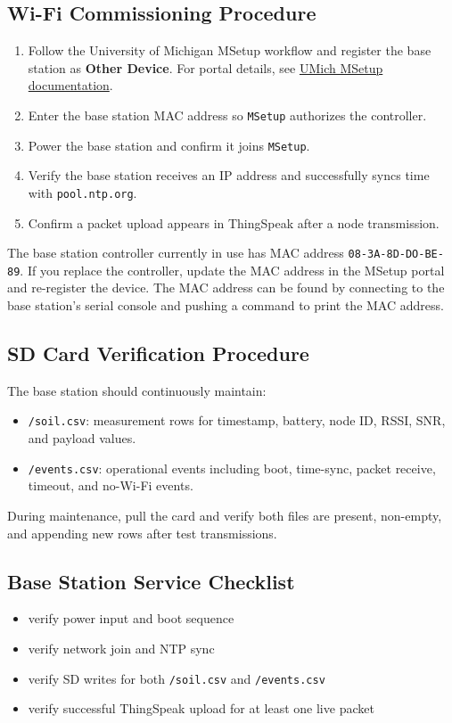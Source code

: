 \documentclass[11pt]{article}
\begin{document}
\subsection{Wi-Fi Commissioning Procedure}
\begin{enumerate}
    \item Follow the University of Michigan MSetup workflow and register the base station as \textbf{Other Device}. For portal details, see \href{https://documentation.its.umich.edu/node/946}{UMich MSetup documentation}.
    \item Enter the base station MAC address so \texttt{MSetup} authorizes the controller.
    \item Power the base station and confirm it joins \texttt{MSetup}.
    \item Verify the base station receives an IP address and successfully syncs time with \texttt{pool.ntp.org}.
    \item Confirm a packet upload appears in ThingSpeak after a node transmission.
\end{enumerate}

The base station controller currently in use has MAC address \texttt{08-3A-8D-DO-BE-89}. If you replace the controller, update the MAC address in the MSetup portal and re-register the device. The MAC address can be found by connecting to the base station's serial console and pushing a command to print the MAC address.

\subsection{SD Card Verification Procedure}
The base station should continuously maintain:
\begin{itemize}
    \item \texttt{/soil.csv}: measurement rows for timestamp, battery, node ID, RSSI, SNR, and payload values.
    \item \texttt{/events.csv}: operational events including boot, time-sync, packet receive, timeout, and no-Wi-Fi events.
\end{itemize}

During maintenance, pull the card and verify both files are present, non-empty, and appending new rows after test transmissions.

\subsection{Base Station Service Checklist}
\begin{itemize}
    \item verify power input and boot sequence
    \item verify network join and NTP sync
    \item verify SD writes for both \texttt{/soil.csv} and \texttt{/events.csv}
    \item verify successful ThingSpeak upload for at least one live packet
\end{itemize}
\end{document}
